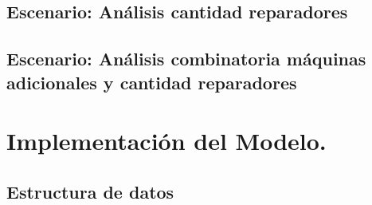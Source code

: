 \documentclass[12pt]{article}
\begin{document}
\subsection{Escenario: An\'alisis cantidad reparadores}
\subsection{Escenario: An\'alisis combinatoria m\'aquinas adicionales y cantidad reparadores}



\section{Implementación del Modelo.}

\subsection{Estructura de datos}
\end{document}
